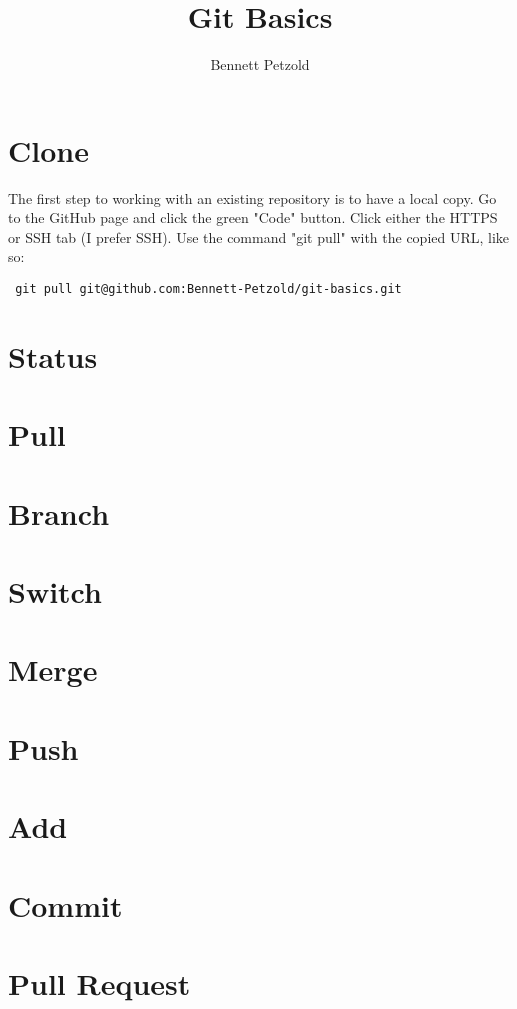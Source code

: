 \documentclass[letterpaper, 12pt]{article}
\title{Git Basics}
\author{Bennett Petzold}
\begin{document}
	\maketitle
	\section*{Clone}
	The first step to working with an existing repository is to have a local copy.
	Go to the GitHub page and click the green "Code" button.
	Click either the HTTPS or SSH tab (I prefer SSH).
	Use the command "git pull" with the copied URL, like so:
	\begin{verbatim} git pull git@github.com:Bennett-Petzold/git-basics.git \end{verbatim}

	\section*{Status}

	\section*{Pull}

	\section*{Branch}

	\section*{Switch}

	\section*{Merge}

	\section*{Push}

	\section*{Add}

	\section*{Commit}

	\section*{Pull Request}
\end{document}
